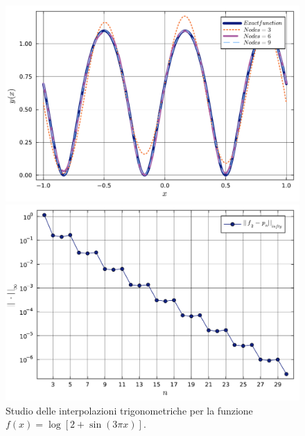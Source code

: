 \documentclass[letterpaper, 12pt]{article}
\numberwithin{equation}{section}    %
\begin{document}
\begin{figure}[!ht]
    \centering
    \begin{minipage}[b]{0.47\textwidth}
        \includegraphics[width=\textwidth]{4613.pdf}
    \end{minipage}
    \hspace{0.5cm}
    \begin{minipage}[b]{0.47\textwidth}
        \includegraphics[width=\textwidth]{4614.pdf}
    \end{minipage}
    \caption{Studio delle interpolazioni trigonometriche per la funzione $f(x) = \log [2+ \sin (3 \pi x ) ]$.}
    \label{fig:es4_6_1_2}
\end{figure}
\end{document}
